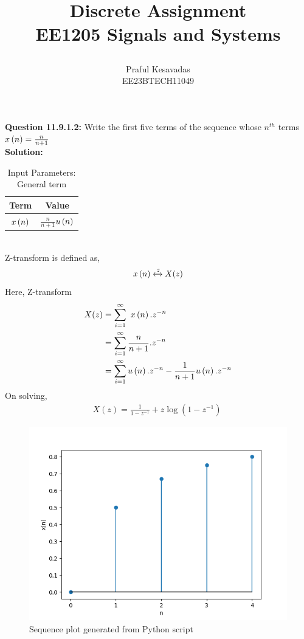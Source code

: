\documentclass{article}
\begin{document}
\title{
\Huge\textbf{Discrete Assignment}\\
\Huge\textbf{EE1205} Signals and Systems\\
\date{}
}
\large\author{Praful Kesavadas\\EE23BTECH11049}
\maketitle

\textbf{Question 11.9.1.2:}
Write the first five terms of the sequence whose $n^{th}$ terms  $x\left(n\right) = \frac{n}{n+1}$\\
\textbf{Solution:}
\begin{table}[ht]
  \centering
  \begin{tabular}{|c|c|}
    \hline
    \textbf{Term} & \textbf{Value} \\
    \hline
    $x\left(n\right)$ & $\frac{n}{n+1}$$u\left(n\right)$ \\
    \hline
  \end{tabular}
  \caption{Input Parameters: General term}
\end{table}\\
Z-transform is defined as,\\
$$ x\left(n\right) \xleftrightarrow z  X(z)$$
Here, Z-transform
\begin{align}
X(z) &= \sum_{i=1}^\infty\ x\left(n\right).z^{-n}\\
&= \sum_{i=1}^\infty \frac{n}{n+1} . z^{-n}\\
&= \sum_{i=1}^\infty u\left(n\right).z^{-n} - \frac{1}{n+1} u\left(n\right).z^{-n}
\end{align}
On solving, 
\begin{align}
X(z) = \frac{1}{1-z^{-1}} + z\log{(1-z^{-1})}\
\end{align}
\begin{figure}[h]
    \centering
    \includegraphics[width=\columnwidth]{figs/graph1.png}
    \caption{Sequence plot generated from Python script}
    \label{fig:sequence-plot}
\end{figure}
\end{document}
